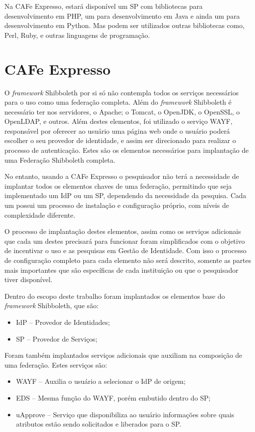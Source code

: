 Na CAFe Expresso, estará disponível um SP com bibliotecas para desenvolvimento em PHP, um para desenvolvimento em Java e ainda um para desenvolvimento em Python. Mas podem ser utilizados outras bibliotecas como, Perl, Ruby, e outras linguagens de programação.

\section{CAFe Expresso}
\label{s_c4_implantacao}

O \textit{framework} Shibboleth por si só não contempla todos os serviços necessários para o uso como uma federação completa. Além do \textit{framework} Shibboleth é necessário ter nos servidores, o Apache; o Tomcat, o OpenJDK, o OpenSSL, o OpenLDAP, e outros. Além destes elementos, foi utilizado o serviço \ac{WAYF}, responsável por oferecer ao usuário uma página web onde o usuário poderá escolher o seu provedor de identidade, e assim ser direcionado para realizar o processo de autenticação. Estes são os elementos necessários para implantação de uma Federação Shibboleth completa.

No entanto, usando a CAFe Expresso o pesquisador não terá a necessidade de implantar todos os elementos chaves de uma federação, permitindo que seja implementado um IdP ou um SP, dependendo da necessidade da pesquisa. Cada um possui um processo de instalação e configuração próprio, com níveis de complexidade diferente. 

O processo de implantação destes elementos, assim como os serviços adicionais que cada um destes precisará para funcionar foram simplificados com o objetivo de incentivar o uso e as pesquisas em Gestão de Identidade. Com isso o processo de configuração completo para cada elemento não será descrito, somente as partes mais importantes que são específicas de cada instituição ou que o pesquisador tiver disponível.

Dentro do escopo deste trabalho foram implantados os elementos base do \textit{framework} Shibboleth, que são: 
\begin{itemize}
\item IdP -- Provedor de Identidades;
\item SP -- Provedor de Serviços;
\end{itemize}

Foram também implantados serviços adicionais que auxiliam na composição de uma federação. Estes serviços são:

\begin{itemize}
\item WAYF -- Auxilia o usuário a selecionar o IdP de origem;
\item EDS -- Mesma função do WAYF, porém embutido dentro do SP;
\item uApprove -- Serviço que disponibiliza ao usuário informações sobre quais atributos estão sendo solicitados e liberados para o SP.
\end{itemize}

